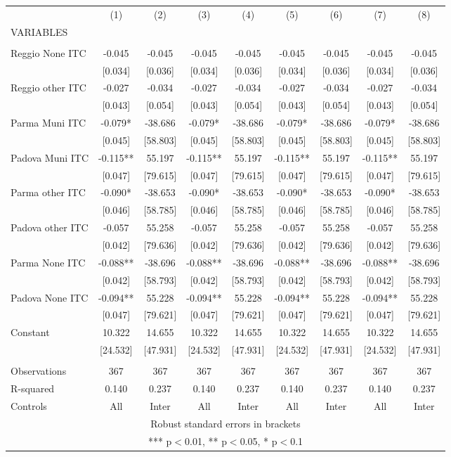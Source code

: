 \begin{tabular}{lcccccccc} \hline
 & (1) & (2) & (3) & (4) & (5) & (6) & (7) & (8) \\
VARIABLES &  &  &  &  &  &  &  &  \\ \hline
 &  &  &  &  &  &  &  &  \\
Reggio None ITC & -0.045 & -0.045 & -0.045 & -0.045 & -0.045 & -0.045 & -0.045 & -0.045 \\
 & [0.034] & [0.036] & [0.034] & [0.036] & [0.034] & [0.036] & [0.034] & [0.036] \\
Reggio other ITC & -0.027 & -0.034 & -0.027 & -0.034 & -0.027 & -0.034 & -0.027 & -0.034 \\
 & [0.043] & [0.054] & [0.043] & [0.054] & [0.043] & [0.054] & [0.043] & [0.054] \\
Parma Muni ITC & -0.079* & -38.686 & -0.079* & -38.686 & -0.079* & -38.686 & -0.079* & -38.686 \\
 & [0.045] & [58.803] & [0.045] & [58.803] & [0.045] & [58.803] & [0.045] & [58.803] \\
Padova Muni ITC & -0.115** & 55.197 & -0.115** & 55.197 & -0.115** & 55.197 & -0.115** & 55.197 \\
 & [0.047] & [79.615] & [0.047] & [79.615] & [0.047] & [79.615] & [0.047] & [79.615] \\
Parma other ITC & -0.090* & -38.653 & -0.090* & -38.653 & -0.090* & -38.653 & -0.090* & -38.653 \\
 & [0.046] & [58.785] & [0.046] & [58.785] & [0.046] & [58.785] & [0.046] & [58.785] \\
Padova other ITC & -0.057 & 55.258 & -0.057 & 55.258 & -0.057 & 55.258 & -0.057 & 55.258 \\
 & [0.042] & [79.636] & [0.042] & [79.636] & [0.042] & [79.636] & [0.042] & [79.636] \\
Parma None ITC & -0.088** & -38.696 & -0.088** & -38.696 & -0.088** & -38.696 & -0.088** & -38.696 \\
 & [0.042] & [58.793] & [0.042] & [58.793] & [0.042] & [58.793] & [0.042] & [58.793] \\
Padova None ITC & -0.094** & 55.228 & -0.094** & 55.228 & -0.094** & 55.228 & -0.094** & 55.228 \\
 & [0.047] & [79.621] & [0.047] & [79.621] & [0.047] & [79.621] & [0.047] & [79.621] \\
Constant & 10.322 & 14.655 & 10.322 & 14.655 & 10.322 & 14.655 & 10.322 & 14.655 \\
 & [24.532] & [47.931] & [24.532] & [47.931] & [24.532] & [47.931] & [24.532] & [47.931] \\
 &  &  &  &  &  &  &  &  \\
Observations & 367 & 367 & 367 & 367 & 367 & 367 & 367 & 367 \\
R-squared & 0.140 & 0.237 & 0.140 & 0.237 & 0.140 & 0.237 & 0.140 & 0.237 \\
 Controls & All & Inter & All & Inter & All & Inter & All & Inter \\ \hline
\multicolumn{9}{c}{ Robust standard errors in brackets} \\
\multicolumn{9}{c}{ *** p$<$0.01, ** p$<$0.05, * p$<$0.1} \\
\end{tabular}
